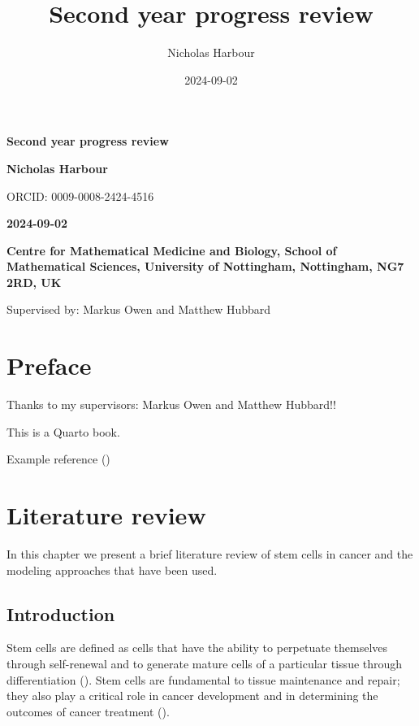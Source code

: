 \documentclass[
  letterpaper,
]{scrreprt}
\title{Second year progress review}
\author{Nicholas Harbour}
\date{2024-09-02}
\renewcommand*\contentsname{Table of contents}
\newcommand\contentsname{Table of contents}
\theoremstyle{definition}
\theoremstyle{remark}
\begin{document}
\cleardoublepage
\thispagestyle{empty}
{\centering
{\Huge\bfseries Second year progress review \par}
\vspace{12ex}
{\Large\bfseries Nicholas Harbour \par}
\vspace{3ex}
{\Large ORCID: 0009-0008-2424-4516 \par}
{\bfseries\large 2024-09-02 \par}
\vspace{12ex}
%
%
{\bfseries\large Centre for Mathematical Medicine and Biology, School of
Mathematical Sciences, University of Nottingham, Nottingham, NG7 2RD,
UK \par}
%
\vspace{12ex}
{\small Supervised by: Markus Owen and Matthew Hubbard\par}
}

\renewcommand*\contentsname{Table of contents}
{
\hypersetup{linkcolor=}
\setcounter{tocdepth}{2}
\tableofcontents
}


\chapter*{Preface}\label{preface}


Thanks to my supervisors: Markus Owen and Matthew Hubbard!!

This is a Quarto book.

Example reference ()


\chapter{Literature review}\label{sec-lit-review}

In this chapter we present a brief literature review of stem cells in
cancer and the modeling approaches that have been used.

\section{Introduction}\label{sec-introduction}

Stem cells are defined as cells that have the ability to perpetuate
themselves through self-renewal and to generate mature cells of a
particular tissue through differentiation (). Stem cells are fundamental to tissue maintenance and
repair; they also play a critical role in cancer development and in
determining the outcomes of cancer treatment
().
\end{document}
